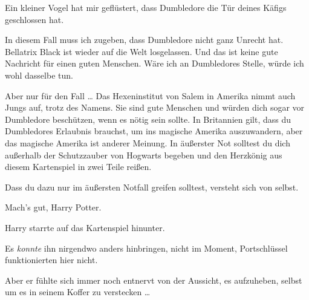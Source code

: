 \begin{writtenNote}
Ein kleiner Vogel hat mir geflüstert, dass Dumbledore die Tür deines Käfigs geschlossen hat.

In diesem Fall muss ich zugeben, dass Dumbledore nicht ganz Unrecht hat. Bellatrix Black ist wieder auf die Welt losgelassen. Und das ist keine gute Nachricht für einen guten Menschen. Wäre ich an Dumbledores Stelle, würde ich wohl dasselbe tun.

Aber nur für den Fall … Das Hexeninstitut von Salem in Amerika nimmt auch Jungs auf, trotz des Namens. Sie sind gute Menschen und würden dich sogar vor Dumbledore beschützen, wenn es nötig sein sollte. In Britannien gilt, dass du Dumbledores Erlaubnis brauchst, um ins magische Amerika auszuwandern, aber das magische Amerika ist anderer Meinung. In äußerster Not solltest du dich außerhalb der Schutzzauber von Hogwarts begeben und den Herzkönig aus diesem Kartenspiel in zwei Teile reißen.

Dass du dazu nur im äußersten Notfall greifen solltest, versteht sich von selbst.

Mach’s gut, Harry Potter.

\end{writtenNote}

Harry starrte auf das Kartenspiel hinunter.

Es \emph{konnte} ihn nirgendwo anders hinbringen, nicht im Moment, Portschlüssel funktionierten hier nicht.

Aber er fühlte sich immer noch entnervt von der Aussicht, es aufzuheben, selbst um es in seinem Koffer zu verstecken …


